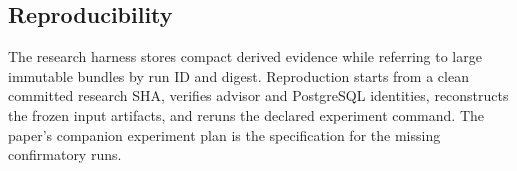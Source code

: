 \subsection{Reproducibility}

The research harness stores compact derived evidence while referring to large
immutable bundles by run ID and digest. Reproduction starts from a clean
committed research SHA, verifies advisor and PostgreSQL identities, reconstructs
the frozen input artifacts, and reruns the declared experiment command. The
paper's companion experiment plan is the specification for the missing
confirmatory runs.
